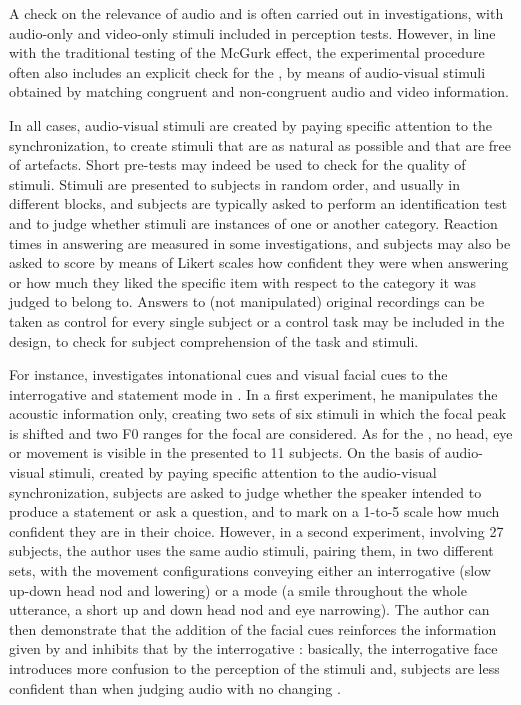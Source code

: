 \documentclass[output=paper]{langsci/langscibook}
\begin{document}
A check on the relevance of audio and  is often carried out in investigations, with audio-only and video-only stimuli included in perception tests. However, in line with the traditional testing of the McGurk effect, the experimental procedure often also includes an explicit check for the , by means of audio-visual stimuli obtained by matching congruent and non-congruent audio and video information. 

In all cases, audio-visual stimuli are created by paying specific attention to the  synchronization, to create stimuli that are as natural as possible and that are free of artefacts.  Short pre-tests may indeed be used to check for the quality of stimuli. Stimuli are presented to subjects in random order, and usually in different blocks, and subjects are typically asked to perform an identification test and to judge whether stimuli are instances of one or another category. Reaction times in answering are measured in some investigations, and subjects may also be asked to score by means of Likert scales how confident they were when answering or how much they liked the specific item with respect to the category it was judged to belong to. Answers to (not manipulated) original recordings can be taken as control for every single subject or a control task may be included in the design, to check for subject comprehension of the task and stimuli.

For instance, \citet{House2002} investigates intonational cues and visual facial cues to the interrogative and statement mode in . In a first experiment, he manipulates the acoustic information only, creating two sets of six stimuli in which the focal  peak is shifted and two F0 ranges for the focal  are considered. As for the , no head, eye or  movement is visible in the  presented to 11 subjects. On the basis of audio-visual stimuli, created by paying specific attention to the audio-visual synchronization, subjects are asked to judge whether the speaker intended to produce a statement or ask a question, and to mark on a 1-to-5 scale how much confident they are in their choice. However, in a second experiment, involving 27 subjects, the author uses the same audio stimuli, pairing them, in two different sets, with the movement configurations conveying either an interrogative (slow up-down head nod and  lowering) or a  mode (a smile throughout the whole utterance, a short up and down head nod and eye narrowing). The author can then demonstrate that the addition of the facial cues reinforces the information given by   and inhibits that by the interrogative : basically, the interrogative face introduces more confusion to the perception of the stimuli and, subjects are less confident than when judging audio with no changing .
\end{document}
